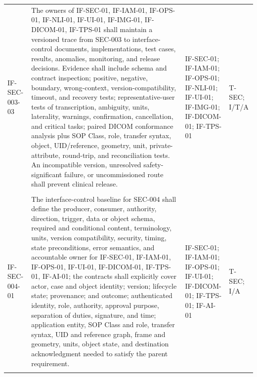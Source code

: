 \documentclass[11pt,letterpaper]{article}
\begin{document}
\begin{scriptsize}
\begin{longtable}{@{}L{0.14\textwidth}L{0.49\textwidth}L{0.19\textwidth}L{0.10\textwidth}@{}}
\addlinespace[2pt]
\mbox{IF-SEC-003-03} & The owners of IF-SEC-01, IF-IAM-01, IF-OPS-01, IF-NLI-01, IF-UI-01, IF-IMG-01, IF-DICOM-01, IF-TPS-01 shall maintain a versioned trace from SEC-003 to interface-control documents, implementations, test cases, results, anomalies, monitoring, and release decisions. Evidence shall include schema and contract inspection; positive, negative, boundary, wrong-context, version-compatibility, timeout, and recovery tests; representative-user tests of transcription, ambiguity, units, laterality, warnings, confirmation, cancellation, and critical tasks; paired DICOM conformance analysis plus SOP Class, role, transfer syntax, object, UID\slash\allowbreak{}reference, geometry, unit, private-attribute, round-trip, and reconciliation tests. An incompatible version, unresolved safety-significant failure, or uncommissioned route shall prevent clinical release. & IF-SEC-01; IF-IAM-01; IF-OPS-01; IF-NLI-01; IF-UI-01; IF-IMG-01; IF-DICOM-01; IF-TPS-01 & T-SEC; I\slash\allowbreak{}T\slash\allowbreak{}A \\
\addlinespace[2pt]
 \\
\addlinespace[2pt]
\mbox{IF-SEC-004-01} & The interface-control baseline for SEC-004 shall define the producer, consumer, authority, direction, trigger, data or object schema, required and conditional content, terminology, units, version compatibility, security, timing, state preconditions, error semantics, and accountable owner for IF-SEC-01, IF-IAM-01, IF-OPS-01, IF-UI-01, IF-DICOM-01, IF-TPS-01, IF-AI-01; the contracts shall explicitly cover actor, case and object identity; version; lifecycle state; provenance; and outcome; authenticated identity, role, authority, approval purpose, separation of duties, signature, and time; application entity, SOP Class and role, transfer syntax, UID and reference graph, frame and geometry, units, object state, and destination acknowledgment needed to satisfy the parent requirement. & IF-SEC-01; IF-IAM-01; IF-OPS-01; IF-UI-01; IF-DICOM-01; IF-TPS-01; IF-AI-01 & T-SEC; I\slash\allowbreak{}A \\
\addlinespace[2pt]

\end{longtable}
\end{scriptsize}
\end{document}

